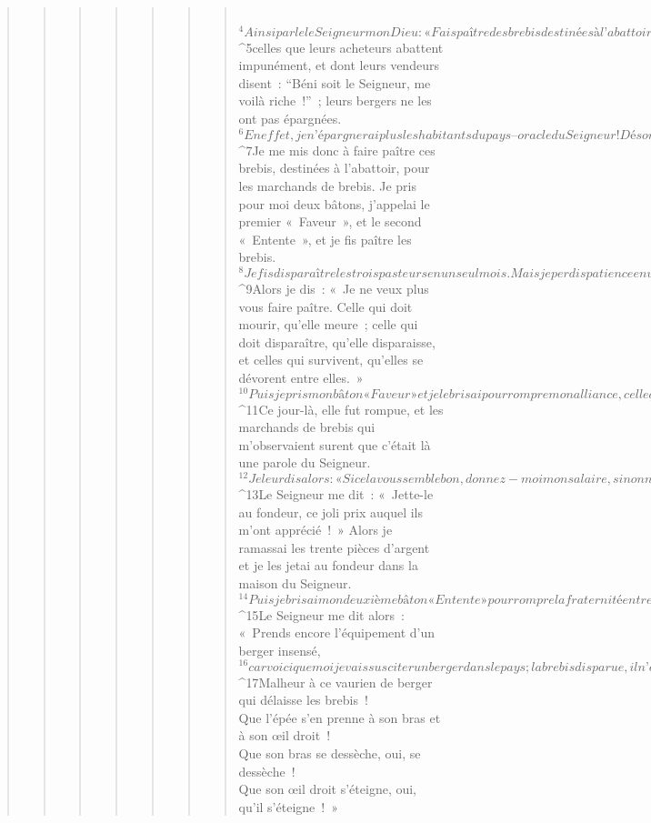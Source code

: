 \begin{verse}
\begin{verse}
\begin{verse}
\begin{verse}
\begin{verse}
\begin{verse}
\begin{verse}
           
${}^{4}Ainsi parle le Seigneur mon Dieu : « Fais paître des brebis destinées à l’abattoir, 
${}^{5}celles que leurs acheteurs abattent impunément, et dont leurs vendeurs disent : “Béni soit le Seigneur, me voilà riche !” ; leurs bergers ne les ont pas épargnées. 
${}^{6}En effet, je n’épargnerai plus les habitants du pays – oracle du Seigneur ! Désormais, moi aussi, je vais livrer les hommes, chacun aux mains de son prochain et aux mains de son roi ; ceux-ci écraseront le pays, mais je ne délivrerai pas les gens de leurs mains. » 
${}^{7}Je me mis donc à faire paître ces brebis, destinées à l’abattoir, pour les marchands de brebis. Je pris pour moi deux bâtons, j’appelai le premier « Faveur », et le second « Entente », et je fis paître les brebis. 
${}^{8}Je fis disparaître les trois pasteurs en un seul mois. Mais je perdis patience envers les brebis, et elles, de leur côté, me prirent en dégoût. 
${}^{9}Alors je dis : « Je ne veux plus vous faire paître. Celle qui doit mourir, qu’elle meure ; celle qui doit disparaître, qu’elle disparaisse, et celles qui survivent, qu’elles se dévorent entre elles. » 
${}^{10}Puis je pris mon bâton « Faveur » et je le brisai pour rompre mon alliance, celle que j’avais conclue avec tous les peuples. 
${}^{11}Ce jour-là, elle fut rompue, et les marchands de brebis qui m’observaient surent que c’était là une parole du Seigneur.
${}^{12}Je leur dis alors : « Si cela vous semble bon, donnez-moi mon salaire, sinon n’en faites rien. » Ils pesèrent mon salaire : trente pièces d’argent. 
${}^{13}Le Seigneur me dit : « Jette-le au fondeur, ce joli prix auquel ils m’ont apprécié ! » Alors je ramassai les trente pièces d’argent et je les jetai au fondeur dans la maison du Seigneur. 
${}^{14}Puis je brisai mon deuxième bâton « Entente » pour rompre la fraternité entre Juda et Israël. 
${}^{15}Le Seigneur me dit alors : « Prends encore l’équipement d’un berger insensé, 
${}^{16}car voici que moi je vais susciter un berger dans le pays ; la brebis disparue, il n’en aura pas souci ; celle qui est égarée, il ne la cherchera pas ; celle qui est blessée, il ne la soignera pas ; celle qui est épuisée, il ne la soutiendra pas, mais il dévorera la chair des bêtes grasses, il arrachera même leurs sabots.
${}^{17}Malheur à ce vaurien de berger qui délaisse les brebis !
        \\Que l’épée s’en prenne à son bras et à son œil droit !
        \\Que son bras se dessèche, oui, se dessèche !
        \\Que son œil droit s’éteigne, oui, qu’il s’éteigne ! »
      

\end{verse}
\end{verse}
\end{verse}
\end{verse}
\end{verse}
\end{verse}
\end{verse}
